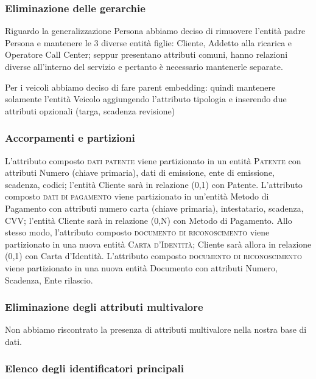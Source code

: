 \documentclass{article}
\begin{document}
\subsubsection{Eliminazione delle gerarchie}

Riguardo la generalizzazione Persona abbiamo deciso di rimuovere l'entità padre Persona e mantenere le 3 diverse entità figlie: Cliente, Addetto alla ricarica e Operatore Call Center; seppur presentano attributi comuni, hanno relazioni diverse all'interno del servizio e pertanto è necessario mantenerle separate.

Per i veicoli abbiamo deciso di fare parent embedding: quindi mantenere solamente l'entità Veicolo aggiungendo l'attributo tipologia e inserendo due attributi opzionali (targa, scadenza revisione) 

\subsubsection{Accorpamenti e partizioni}
L'attributo composto \textsc{dati patente} viene partizionato in un entità \textsc{Patente} con attributi Numero (chiave primaria), dati di emissione, ente di emissione, scadenza, codici; l'entità Cliente sarà in relazione (0,1) con Patente.
L'attributo composto \textsc{dati di pagamento} viene partizionato in un'entità Metodo di Pagamento con attributi numero carta (chiave primaria), intestatario, scadenza, CVV; l'entità Cliente sarà in relazione (0,N) con Metodo di Pagamento.
Allo stesso modo, l'attributo composto \textsc{documento di riconoscimento} viene partizionato in una nuova entità \textsc{Carta d'Identità}; Cliente sarà allora in relazione (0,1) con Carta d'Identità.
L'attributo composto \textsc{documento di riconoscimento} viene partizionato in una nuova entità Documento con attributi Numero, Scadenza, Ente rilascio.

\subsubsection{Eliminazione degli attributi multivalore}
Non abbiamo riscontrato la presenza di attributi multivalore nella nostra base di dati.


\subsubsection{Elenco degli identificatori principali}
\end{document}
